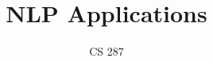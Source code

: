 \documentclass{beamer}
\title{NLP Applications}
\date{}
\author{CS 287 }
\begin{document}
\begin{frame}
  \titlepage
\end{frame}
\end{document}
